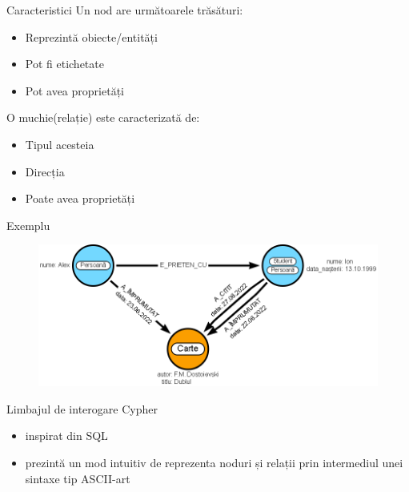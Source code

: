 \documentclass{beamer}
\begin{document}
\begin{frame}{Caracteristici}
    Un nod are următoarele trăsături:
    
    \begin{itemize}
        \item Reprezintă obiecte/entități
        \item Pot fi etichetate
        \item Pot avea proprietăți
    \end{itemize}
    
    O muchie(relație) este caracterizată de:
    
    \begin{itemize}
        \item Tipul acesteia
        \item Direcția
        \item Poate avea proprietăți
    \end{itemize}
\end{frame}

\begin{frame}[fragile]{Exemplu}
    \begin{figure}[H]
        \centering
        \begin{adjustbox}{max size={\textwidth}{\textheight}}
        \includegraphics[scale = 0.4]{exemplu_1}
        \end{adjustbox}
    \end{figure}
\end{frame}

\begin{frame}{Limbajul de interogare Cypher}
    \begin{itemize}
        \item inspirat din SQL
        \item prezintă un mod intuitiv de reprezenta noduri și relații prin intermediul unei sintaxe tip ASCII-art
    \end{itemize}
\end{frame}
\end{document}
